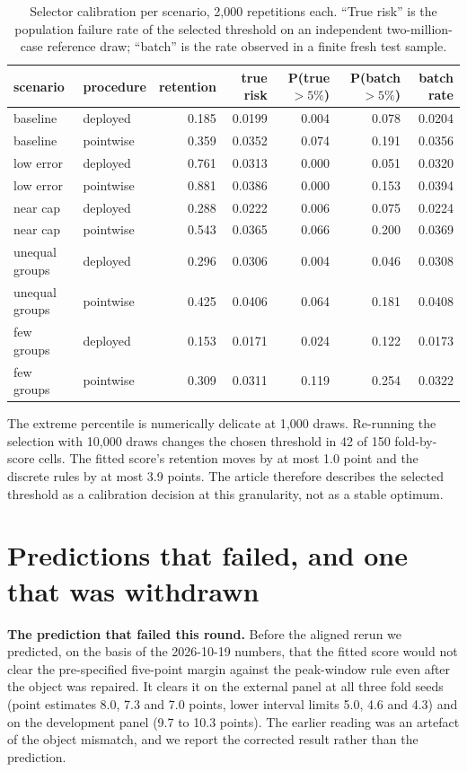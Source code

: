 \documentclass[draft]{agujournal2025}
\newcommand{\tabletext}{%
  \footnotesize
  \setlength{\baselineskip}{10pt}%
  \setlength{\parindent}{0pt}%
}
\begin{document}
\begin{table}
\caption{Selector calibration per scenario, 2{,}000 repetitions each. ``True
risk'' is the population failure rate of the selected threshold on an independent
two-million-case reference draw; ``batch'' is the rate observed in a finite
fresh test sample.}
\label{tab:si-selector}
\tabletext
\centering
\begin{tabular}{llrrrrr}
\hline
scenario & procedure & retention & true risk & P(true $>5\%$) & P(batch $>5\%$) & batch rate \\
\hline
baseline & deployed & 0.185 & 0.0199 & 0.004 & 0.078 & 0.0204 \\
baseline & pointwise & 0.359 & 0.0352 & 0.074 & 0.191 & 0.0356 \\
low error & deployed & 0.761 & 0.0313 & 0.000 & 0.051 & 0.0320 \\
low error & pointwise & 0.881 & 0.0386 & 0.000 & 0.153 & 0.0394 \\
near cap & deployed & 0.288 & 0.0222 & 0.006 & 0.075 & 0.0224 \\
near cap & pointwise & 0.543 & 0.0365 & 0.066 & 0.200 & 0.0369 \\
unequal groups & deployed & 0.296 & 0.0306 & 0.004 & 0.046 & 0.0308 \\
unequal groups & pointwise & 0.425 & 0.0406 & 0.064 & 0.181 & 0.0408 \\
few groups & deployed & 0.153 & 0.0171 & 0.024 & 0.122 & 0.0173 \\
few groups & pointwise & 0.309 & 0.0311 & 0.119 & 0.254 & 0.0322 \\
\hline
\end{tabular}
\end{table}

The extreme percentile is numerically delicate at 1{,}000 draws. Re-running the
selection with 10{,}000 draws changes the chosen threshold in 42 of 150
fold-by-score cells. The fitted score's retention moves by at most 1.0 point and
the discrete rules by at most 3.9 points. The article therefore describes the
selected threshold as a calibration decision at this granularity, not as a stable
optimum.

\section{Predictions that failed, and one that was withdrawn}

\textbf{The prediction that failed this round.} Before the aligned rerun we
predicted, on the basis of the 2026-10-19 numbers, that the fitted score would
not clear the pre-specified five-point margin against the peak-window rule even
after the object was repaired. It clears it on the external panel at all three
fold seeds (point estimates 8.0, 7.3 and 7.0 points, lower interval limits 5.0, 4.6
and 4.3) and on the development panel (9.7 to 10.3 points). The earlier reading
was an artefact of the object mismatch, and we report the corrected result rather
than the prediction.
\end{document}
